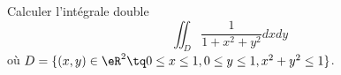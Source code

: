 
\begin{exercice}\label{exoOutilsMath-0105}

    Calculer l'intégrale double
    \begin{equation}
        \iint_D\frac{ 1 }{ 1+x^2+y^2 }dxdy
    \end{equation}
    où $D=\{ (x,y)\in\eR^2\tq 0\leq x\leq 1,0\leq y\leq 1,x^2+y^2\leq 1 \}$.

\end{exercice}
